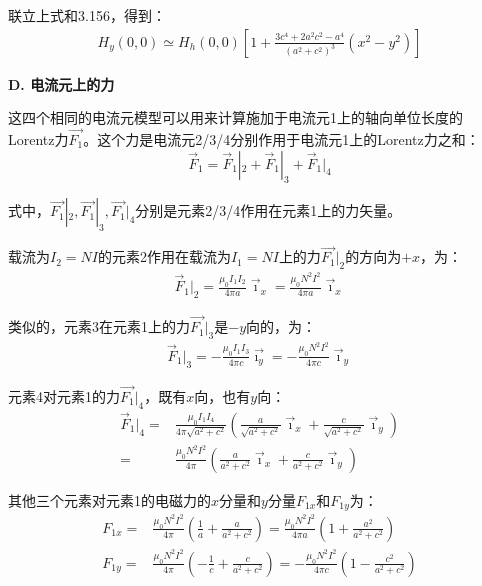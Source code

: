 联立上式和3.156，得到：
\begin{align*}
H_{y}(0,0)\simeq H_{h}(0,0)\left[1+\frac{3c^{4}+2a^{2}c^{2}-a^{4}}{(a^{2}+c^{2})^{3}}(x^{2}-y^{2})\right]\tag{3.157b}%
\end{align*}

\textbf{D. 电流元上的力}

这四个相同的电流元模型可以用来计算施加于电流元1上的轴向单位长度的
Lorentz力$\vec{F_1}$。这个力是电流元2/3/4分别作用于电流元1上的Lorentz力之和：
\begin{equation}
\vec{F}_{1}=\vec{F}_{1}|_{2}+\vec{F}_{1}|_{3}+\vec{F}_{1}|_{4}%
\end{equation}

式中，$\vec{F_1}|_2, \vec{F_1}|_3, \vec{F_1}|_4$分别是元素2/3/4作用在元素1上的力矢量。

载流为$I_2=NI$的元素2作用在载流为$I_1=NI$上的力$\vec{F_1}|_2$的方向为$+x$，为：
\begin{align}
\vec{F}_{1}|_{2}=\frac{\mu_{0}I_{1}I_{2}}{4\pi a}\vec{\imath}_{x}=\frac{\mu_{0}N^{2}I^{2}}{4\pi a}\vec{\imath}_{x}%
\end{align}

类似的，元素3在元素1上的力$\vec{F_1}|_3$是$-y$向的，为：
\begin{align*}
\vec{F}_{1}|_{3}=-\frac{\mu_{0}I_{1}I_{3}}{4\pi c}\vec{\imath_{y}}=-\frac{\mu_{0}N^{2}I^{2}}{4\pi c}\vec{\imath}_{y}\tag{3.159b}%
\end{align*}

元素4对元素1的力$\vec{F_1}|_4$，既有$x$向，也有$y$向：
\begin{align*}
\vec{F}_{1}|_{4}=&\frac{\mu_{0}I_{1}I_{4}}{4\pi\sqrt{a^{2}+c^{2}}}(\frac{a}{\sqrt{a^{2}+c^{2}}}\vec{\imath}_{x}+\frac{c}{\sqrt{a^{2}+c^{2}}}\vec{\imath}_{y})\\
=&\frac{\mu_{0}N^{2}I^{2}}{4\pi}(\frac{a}{a^{2}+c^{2}}\vec{\imath}_{x}+\frac{c}{a^{2}+c^{2}}\vec{\imath}_{y})\tag{3.159c}
\end{align*}

其他三个元素对元素1的电磁力的$x$分量和$y$分量$F_{1x}$和$F_{1y}$为：
\begin{subequations}
	\begin{align}
F_{1x}=&\frac{\mu_{0}N^{2}I^{2}}{4\pi}(\frac{1}{a}+\frac{a}{a^{2}+c^{2}})=\frac{\mu_{0}N^{2}I^{2}}{4\pi a}(1+\frac{a^{2}}{a^{2}+c^{2}})\\%
F_{1y}=&\frac{\mu_{0}N^{2}I^{2}}{4\pi}(-\frac{1}{c}+\frac{c}{a^{2}+c^{2}})=-\frac{\mu_{0}N^{2}I^{2}}{4\pi c}(1-\frac{c^{2}}{a^{2}+c^{2}})%
\end{align}
\end{subequations}


